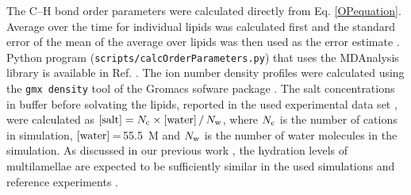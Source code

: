 \documentclass[journal=jpcbfk,manuscript=article]{achemso}
\begin{document}
The C--H bond order parameters were calculated directly from Eq. \ref{OPequation}.
Average over the time for individual lipids was calculated first and
the standard error of the mean of the average over lipids was then used as the
error estimate \cite{botan15,ollila16,NMRlipidsIV}.
Python program ({\tt scripts/calcOrderParameters.py}) that uses the
MDAnalysis library \cite{agrawal11,gowers16} is available in Ref. . 
The ion number density profiles were calculated using the {\tt gmx density} tool
of the Gromacs sofware package \cite{gromacsMANUAL}.
The salt concentrations in buffer before solvating the lipids, reported in the used experimental data set \cite{roux90},
were calculated as $[{\rm salt}]=N_{\rm c} \times[{\rm water}]\,/\,N_{\rm w}$,
where $N_{\rm c}$ is the number of cations in simulation, $[{\rm water}]$\,=\,55.5~M and $N_{\rm w}$
is the number of water molecules in the simulation.
As discussed in our previous work \cite{NMRlipidsIV}, the hydration levels of
multilamellae are expected to be sufficiently similar in the used simulations and reference experiments \cite{roux90}.

\end{document}

